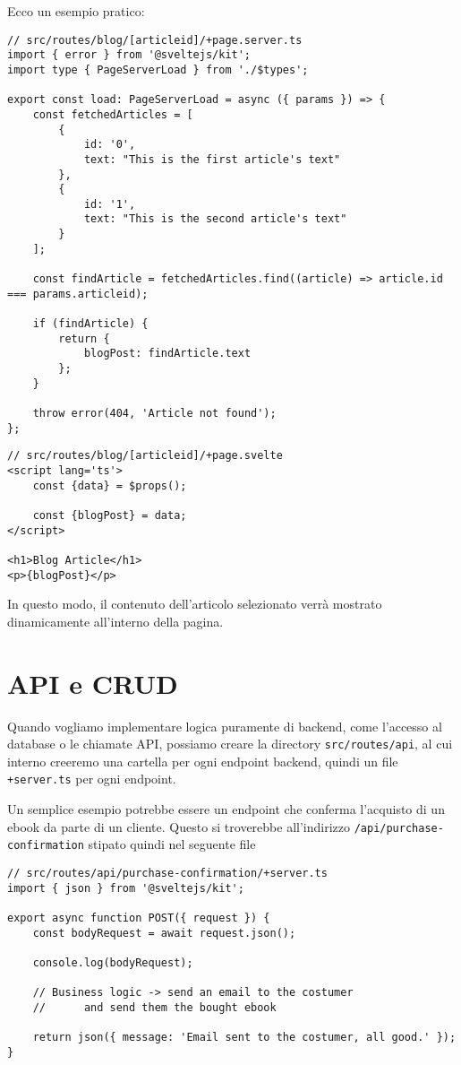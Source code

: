 \documentclass[12pt]{article}
\begin{document}
Ecco un esempio pratico:
\begin{verbatim}
// src/routes/blog/[articleid]/+page.server.ts
import { error } from '@sveltejs/kit';
import type { PageServerLoad } from './$types';

export const load: PageServerLoad = async ({ params }) => {
	const fetchedArticles = [
		{
			id: '0',
			text: "This is the first article's text"
		},
		{
			id: '1',
			text: "This is the second article's text"
		}
	];

	const findArticle = fetchedArticles.find((article) => article.id === params.articleid);

	if (findArticle) {
		return {
			blogPost: findArticle.text
		};
	}

	throw error(404, 'Article not found');
};
\end{verbatim}
\pagebreak
\begin{verbatim}
// src/routes/blog/[articleid]/+page.svelte
<script lang='ts'>
    const {data} = $props();

    const {blogPost} = data;
</script>

<h1>Blog Article</h1>
<p>{blogPost}</p>
\end{verbatim}
In questo modo, il contenuto dell'articolo selezionato
verrà mostrato dinamicamente all'interno della pagina.


\section{API e CRUD}
Quando vogliamo implementare logica puramente di 
backend, come l'accesso al database o le chiamate API,
possiamo creare la directory \texttt{src/routes/api},
al cui interno creeremo una cartella per ogni endpoint
backend, quindi un file \texttt{+server.ts} per ogni
endpoint.

Un semplice esempio potrebbe essere un endpoint che
conferma l'acquisto di un ebook da parte di un cliente.
Questo si troverebbe all'indirizzo
\texttt{/api/purchase-confirmation} stipato quindi 
nel seguente file
\begin{verbatim}
// src/routes/api/purchase-confirmation/+server.ts
import { json } from '@sveltejs/kit';

export async function POST({ request }) {
	const bodyRequest = await request.json();

	console.log(bodyRequest);

	// Business logic -> send an email to the costumer
	//      and send them the bought ebook

	return json({ message: 'Email sent to the costumer, all good.' });
}
\end{verbatim}
\end{document}
